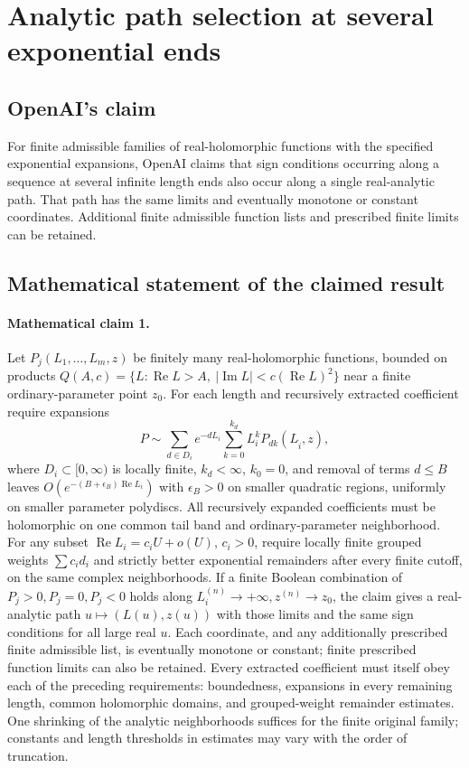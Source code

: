 \documentclass[11pt]{article}
\begin{document}
\section*{Analytic path selection at several exponential ends}

\subsection{OpenAI's claim}
For finite admissible families of real-holomorphic functions with the specified exponential expansions, OpenAI claims that sign conditions occurring along a sequence at several infinite length ends also occur along a single real-analytic path. That path has the same limits and eventually monotone or constant coordinates. Additional finite admissible function lists and prescribed finite limits can be retained.

\subsection{Mathematical statement of the claimed result}
\paragraph{Mathematical claim 1.} Let $P_j(L_1,\ldots,L_m,z)$ be finitely many real-holomorphic functions, bounded on products $Q(A,c)=\{L:\operatorname{Re}L>A,\ |\operatorname{Im}L|<c(\operatorname{Re}L)^2\}$ near a finite ordinary-parameter point $z_0$. For each length and recursively extracted coefficient require expansions \[P\sim\sum_{d\in D_i}e^{-dL_i}\sum_{k=0}^{k_d}L_i^kP_{dk}(L_{\widehat i},z),\] where $D_i\subset[0,\infty)$ is locally finite, $k_d<\infty$, $k_0=0$, and removal of terms $d\le B$ leaves $O(e^{-(B+\epsilon_B)\operatorname{Re}L_i})$ with $\epsilon_B>0$ on smaller quadratic regions, uniformly on smaller parameter polydiscs. All recursively expanded coefficients must be holomorphic on one common tail band and ordinary-parameter neighborhood. For any subset $\operatorname{Re}L_i=c_iU+o(U)$, $c_i>0$, require locally finite grouped weights $\sum c_id_i$ and strictly better exponential remainders after every finite cutoff, on the same complex neighborhoods. If a finite Boolean combination of $P_j>0,P_j=0,P_j<0$ holds along $L_i^{(n)}\to+\infty,z^{(n)}\to z_0$, the claim gives a real-analytic path $u\mapsto(L(u),z(u))$ with those limits and the same sign conditions for all large real $u$. Each coordinate, and any additionally prescribed finite admissible list, is eventually monotone or constant; finite prescribed function limits can also be retained. Every extracted coefficient must itself obey each of the preceding requirements: boundedness, expansions in every remaining length, common holomorphic domains, and grouped-weight remainder estimates. One shrinking of the analytic neighborhoods suffices for the finite original family; constants and length thresholds in estimates may vary with the order of truncation.
\end{document}
